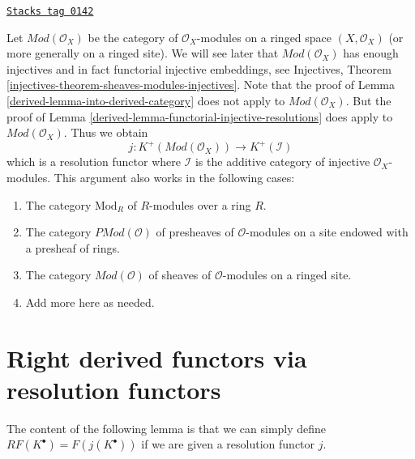 \begin{remark}
\label{derived-remark-big-abelian-category}
\href{https://stacks.math.columbia.edu/tag/0142}{\texttt{Stacks tag 0142}}

Let $\textit{Mod}(\mathcal{O}_X)$ be the category of $\mathcal{O}_X$-modules
on a ringed space $(X, \mathcal{O}_X)$ (or more generally on a
ringed site). We will see later that $\textit{Mod}(\mathcal{O}_X)$ has enough
injectives and in fact functorial injective embeddings, see
Injectives, Theorem \ref{injectives-theorem-sheaves-modules-injectives}.
Note that the proof of Lemma \ref{derived-lemma-into-derived-category} does
not apply to $\textit{Mod}(\mathcal{O}_X)$. But the proof of
Lemma \ref{derived-lemma-functorial-injective-resolutions} does apply
to $\textit{Mod}(\mathcal{O}_X)$. Thus we obtain
$$
j : K^{+}(\textit{Mod}(\mathcal{O}_X))
\longrightarrow
K^{+}(\mathcal{I})
$$
which is a resolution functor where $\mathcal{I}$ is the additive
category of injective $\mathcal{O}_X$-modules. This argument also
works in the following cases:
\begin{enumerate}
\item The category $\text{Mod}_R$ of $R$-modules over a ring $R$.
\item The category $\textit{PMod}(\mathcal{O})$ of presheaves of
$\mathcal{O}$-modules on a site endowed with a presheaf of rings.
\item The category $\textit{Mod}(\mathcal{O})$ of sheaves of
$\mathcal{O}$-modules on a ringed site.
\item Add more here as needed.
\end{enumerate}
\end{remark}

\section{Right derived functors via resolution functors}
\label{derived-section-right-derived-functor-via-resolutions}
The content of the following lemma is that we can simply define
$RF(K^\bullet) = F(j(K^\bullet))$ if we are given a resolution functor $j$.

